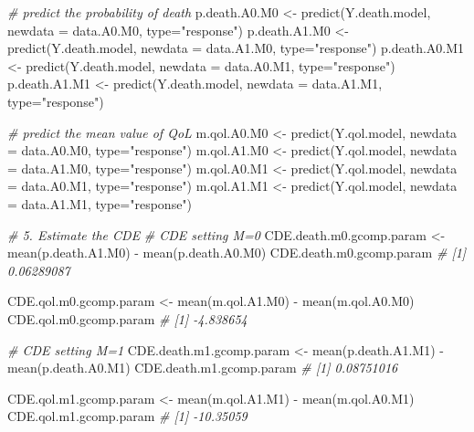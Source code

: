 \documentclass[
]{book}
\newenvironment{Shaded}{\begin{snugshade}}{\end{snugshade}}
\newcommand{\AttributeTok}[1]{\textcolor[rgb]{0.77,0.63,0.00}{#1}}
\newcommand{\CommentTok}[1]{\textcolor[rgb]{0.56,0.35,0.01}{\textit{#1}}}
\newcommand{\FunctionTok}[1]{\textcolor[rgb]{0.00,0.00,0.00}{#1}}
\newcommand{\NormalTok}[1]{#1}
\newcommand{\OtherTok}[1]{\textcolor[rgb]{0.56,0.35,0.01}{#1}}
\newcommand{\SpecialCharTok}[1]{\textcolor[rgb]{0.00,0.00,0.00}{#1}}
\newcommand{\StringTok}[1]{\textcolor[rgb]{0.31,0.60,0.02}{#1}}
\begin{document}
\begin{Shaded}
\begin{Highlighting}[]
\CommentTok{\# predict the probability of death}
\NormalTok{p.death.A0.M0 }\OtherTok{\textless{}{-}} \FunctionTok{predict}\NormalTok{(Y.death.model, }\AttributeTok{newdata =}\NormalTok{ data.A0.M0, }\AttributeTok{type=}\StringTok{"response"}\NormalTok{)}
\NormalTok{p.death.A1.M0 }\OtherTok{\textless{}{-}} \FunctionTok{predict}\NormalTok{(Y.death.model, }\AttributeTok{newdata =}\NormalTok{ data.A1.M0, }\AttributeTok{type=}\StringTok{"response"}\NormalTok{)}
\NormalTok{p.death.A0.M1 }\OtherTok{\textless{}{-}} \FunctionTok{predict}\NormalTok{(Y.death.model, }\AttributeTok{newdata =}\NormalTok{ data.A0.M1, }\AttributeTok{type=}\StringTok{"response"}\NormalTok{)}
\NormalTok{p.death.A1.M1 }\OtherTok{\textless{}{-}} \FunctionTok{predict}\NormalTok{(Y.death.model, }\AttributeTok{newdata =}\NormalTok{ data.A1.M1, }\AttributeTok{type=}\StringTok{"response"}\NormalTok{)}

\CommentTok{\# predict the mean value of QoL}
\NormalTok{m.qol.A0.M0 }\OtherTok{\textless{}{-}} \FunctionTok{predict}\NormalTok{(Y.qol.model, }\AttributeTok{newdata =}\NormalTok{ data.A0.M0, }\AttributeTok{type=}\StringTok{"response"}\NormalTok{)}
\NormalTok{m.qol.A1.M0 }\OtherTok{\textless{}{-}} \FunctionTok{predict}\NormalTok{(Y.qol.model, }\AttributeTok{newdata =}\NormalTok{ data.A1.M0, }\AttributeTok{type=}\StringTok{"response"}\NormalTok{)}
\NormalTok{m.qol.A0.M1 }\OtherTok{\textless{}{-}} \FunctionTok{predict}\NormalTok{(Y.qol.model, }\AttributeTok{newdata =}\NormalTok{ data.A0.M1, }\AttributeTok{type=}\StringTok{"response"}\NormalTok{)}
\NormalTok{m.qol.A1.M1 }\OtherTok{\textless{}{-}} \FunctionTok{predict}\NormalTok{(Y.qol.model, }\AttributeTok{newdata =}\NormalTok{ data.A1.M1, }\AttributeTok{type=}\StringTok{"response"}\NormalTok{)}

\CommentTok{\# 5. Estimate the CDE}
\CommentTok{\# CDE setting M=0}
\NormalTok{CDE.death.m0.gcomp.param }\OtherTok{\textless{}{-}} \FunctionTok{mean}\NormalTok{(p.death.A1.M0) }\SpecialCharTok{{-}} \FunctionTok{mean}\NormalTok{(p.death.A0.M0)}
\NormalTok{CDE.death.m0.gcomp.param}
\CommentTok{\# [1] 0.06289087}

\NormalTok{CDE.qol.m0.gcomp.param }\OtherTok{\textless{}{-}} \FunctionTok{mean}\NormalTok{(m.qol.A1.M0) }\SpecialCharTok{{-}} \FunctionTok{mean}\NormalTok{(m.qol.A0.M0)}
\NormalTok{CDE.qol.m0.gcomp.param}
\CommentTok{\# [1] {-}4.838654}

\CommentTok{\# CDE setting M=1}
\NormalTok{CDE.death.m1.gcomp.param }\OtherTok{\textless{}{-}} \FunctionTok{mean}\NormalTok{(p.death.A1.M1) }\SpecialCharTok{{-}} \FunctionTok{mean}\NormalTok{(p.death.A0.M1)}
\NormalTok{CDE.death.m1.gcomp.param}
\CommentTok{\# [1] 0.08751016}

\NormalTok{CDE.qol.m1.gcomp.param }\OtherTok{\textless{}{-}} \FunctionTok{mean}\NormalTok{(m.qol.A1.M1) }\SpecialCharTok{{-}} \FunctionTok{mean}\NormalTok{(m.qol.A0.M1)}
\NormalTok{CDE.qol.m1.gcomp.param}
\CommentTok{\# [1] {-}10.35059}
\end{Highlighting}
\end{Shaded}
\end{document}
